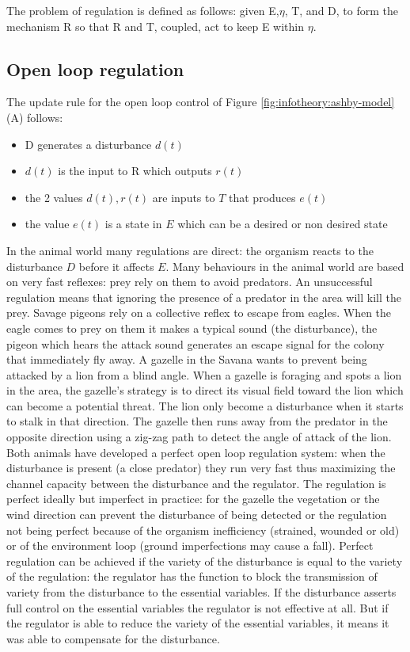 The problem of regulation is defined as follows: 
given E,$\eta$, T, and D, to form the mechanism R so that R and T, coupled, 
act to keep E within $\eta$.

\subsection{Open loop regulation}
The update rule for the open loop control of Figure \ref{fig:infotheory:ashby-model}(A) follows:
\begin{itemize}
 \item D generates a disturbance $d(t)$
 \item $d(t)$ is the input to R which outputs $r(t)$
 \item the 2 values $d(t),r(t)$ are inputs to $T$ that produces $e(t)$
 \item the value $e(t)$ is a state in $E$ which can be a desired or non desired state
\end{itemize}
In the animal world many regulations are direct: the organism reacts to the disturbance $D$ before it affects $E$.
Many behaviours in the animal world are based on very fast reflexes: prey rely on them to avoid predators.
An unsuccessful regulation means that ignoring the presence of a predator in the area will kill the prey.
Savage pigeons rely on a collective reflex to escape from eagles.
When the eagle comes to prey on them it makes a typical sound (the disturbance),
the pigeon which hears the attack sound generates an escape signal for the colony
 that immediately fly away.
A gazelle in the Savana wants to prevent being attacked by a lion from a blind angle.
When a gazelle is foraging and spots a lion in the area, the gazelle's strategy is
 to direct its visual field toward the lion which can become a potential threat.
The lion only become a disturbance when it starts to stalk in that direction.
The gazelle then runs away from the predator in the opposite direction using a 
zig-zag path to detect the angle of attack of the lion. Both animals have
developed a perfect open loop regulation system: when the disturbance is present
(a close predator) they run very fast thus maximizing the channel capacity between
 the disturbance and the regulator. The regulation is perfect ideally but imperfect
 in practice: for the gazelle the vegetation or the wind direction can prevent
the disturbance of being detected or the regulation not being perfect because
 of the organism inefficiency (strained, wounded or old) or of the environment
 loop (ground imperfections may cause a fall).
Perfect regulation can be achieved if the variety of the disturbance is equal
to the variety of the regulation: the regulator has the function to block the
transmission of variety from the disturbance to the essential variables.
If the disturbance asserts full control on the essential variables the regulator
 is not effective at all. But if the regulator is able to reduce the variety of
the essential variables, it means it was able to compensate for the disturbance.


